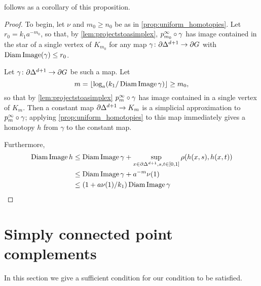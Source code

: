 \documentclass[a4paper]{article}
\begin{document}
 follows as a corollary of this proposition.

\ddagimpliesLCd*

\begin{proof}
  To begin, let $\nu$ and $m_0 \geq n_0$ be as in
  \cref{prop:uniform_homotopies}. Let $r_0 =
  k_1a^{-m_0}$, so that, by \cref{lem:projectstoasimplex},
  $p^\infty_{m_0}\circ\gamma$ has image contained in the star of a single
  vertex of $K_{m_0}$ for any map $\gamma\colon\partial\Delta^{d+1}\to\partial
  G$ with $\operatorname{Diam}\operatorname{Image}(\gamma)\leq r_0$.

  Let $\gamma\colon\partial\Delta^{d+1}\to\partial G$ be such a map. Let 
  \begin{equation*}
    m = \lfloor\log_a(k_1/\operatorname{Diam}\operatorname{Image}\gamma)\rfloor \geq m_0,
  \end{equation*}
  so that by \cref{lem:projectstoasimplex} $p^\infty_{m}\circ\gamma$ has
  image contained in a single vertex of $K_m$. Then a constant map
  $\partial\Delta^{d+1} \to K_m$ is a simplicial approximation to
  $p^\infty_m\circ\gamma$; applying \cref{prop:uniform_homotopies} to
  this map immediately gives a homotopy $h$ from $\gamma$ to the constant map.

  Furthermore,
  \begin{align*}
    \operatorname{Diam}\operatorname{Image} h &\leq \operatorname{Diam}\operatorname{Image}\gamma + \sup_{x \in\partial\Delta^{d+1}, s,t \in [0,1]} \rho(h(x,s), h(x,t)) \\
                  &\leq \operatorname{Diam}\operatorname{Image}\gamma + a^{-m} \nu(1) \\
                  &\leq (1 + a\nu(1)/k_1) \operatorname{Diam}\operatorname{Image}\gamma \qedhere
  \end{align*}
\end{proof}

\section{Simply connected point complements}

In this section we give a sufficient condition for our condition
 to be satisfied.


\end{document}
